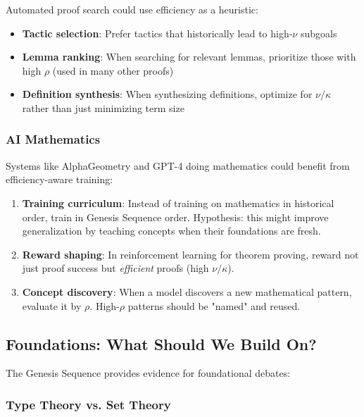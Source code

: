 \documentclass[11pt]{article}
\theoremstyle{definition}
\begin{document}
Automated proof search could use efficiency as a heuristic:

\begin{itemize}
\item \textbf{Tactic selection}: Prefer tactics that historically lead to high-$\nu$ subgoals
\item \textbf{Lemma ranking}: When searching for relevant lemmas, prioritize those with high $\rho$ (used in many other proofs)
\item \textbf{Definition synthesis}: When synthesizing definitions, optimize for $\nu/\kappa$ rather than just minimizing term size
\end{itemize}

\subsubsection{AI Mathematics}

Systems like AlphaGeometry and GPT-4 doing mathematics could benefit from efficiency-aware training:

\begin{enumerate}
\item \textbf{Training curriculum}: Instead of training on mathematics in historical order, train in Genesis Sequence order. Hypothesis: this might improve generalization by teaching concepts when their foundations are fresh.

\item \textbf{Reward shaping}: In reinforcement learning for theorem proving, reward not just proof success but \emph{efficient} proofs (high $\nu/\kappa$).

\item \textbf{Concept discovery}: When a model discovers a new mathematical pattern, evaluate it by $\rho$. High-$\rho$ patterns should be "named" and reused.
\end{enumerate}

\subsection{Foundations: What Should We Build On?}

The Genesis Sequence provides evidence for foundational debates:

\subsubsection{Type Theory vs. Set Theory}
\end{document}
